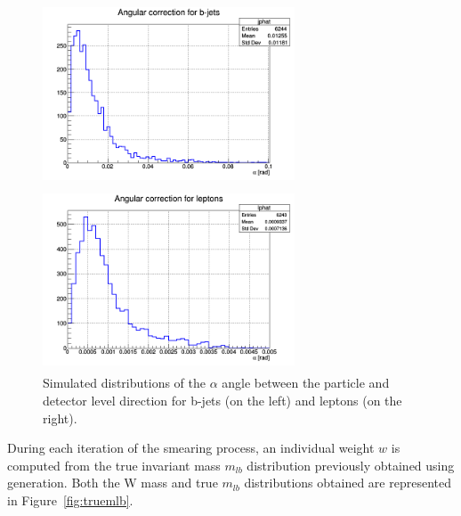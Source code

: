 \documentclass[a4paper, 10pt, openright]{report}
\begin{document}
\begin{figure}[htbp]
\centering
\begin{minipage}[b]{.48\textwidth}
\includegraphics[width=7.5cm, height=5.4cm]{figs/jphat.png}
\end{minipage}\hfill
\begin{minipage}[b]{.48\textwidth}
\includegraphics[width=7.5cm, height=5.4cm]{figs/lphat.png}
\end{minipage} \hfill
\caption{Simulated distributions of the $\alpha$ angle between the particle and detector level direction for b-jets (on the left) and leptons (on the right).}
\label{fig:angdistributions}
\end{figure}

During each iteration of the smearing process, an individual weight $w$ is computed from the true invariant mass $m_{lb}$ distribution previously obtained using generation. Both the W mass and true $m_{lb}$ distributions obtained are represented in Figure~\ref{fig:truemlb}.
\end{document}
